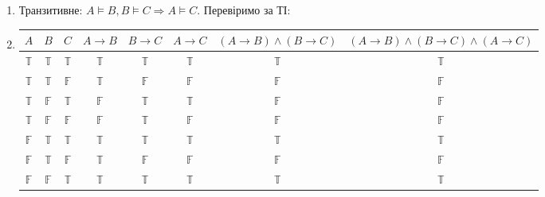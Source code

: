 \documentclass[a4paper,12pt]{article}
\begin{document}
\begin{enumerate}
\begin{enumerate}
\begin{enumerate}
\item Транзитивне: $A\models B, B\models C\Rightarrow A\models C.$ Перевіримо за ТІ:
\item \begin{table}[htp]\centering
\begin{tabular}{|c|c|c|c|c|c|c|c|}\hline
$A$          & $B$          & $C$          & $A\rightarrow B$                     & $B\rightarrow C$                     & $A\rightarrow C$ & $(A\rightarrow B)\land(B\rightarrow C)$ & $(A\rightarrow B)\land(B\rightarrow C)\land(A\rightarrow C)$ \\\hline
$\mathbb{T}$ & $\mathbb{T}$ & $\mathbb{T}$ & \cellcolor[HTML]{FFFFFF}$\mathbb{T}$ & \cellcolor[HTML]{FFFFFF}$\mathbb{T}$ & $\mathbb{T}$     & $\mathbb{T}$                            & \cellcolor[HTML]{9AFF99}$\mathbb{T}$                         \\
$\mathbb{T}$ & $\mathbb{T}$ & $\mathbb{F}$ & $\mathbb{T}$                         & $\mathbb{F}$                         & $\mathbb{F}$     & $\mathbb{F}$                            & $\mathbb{F}$                                                 \\
$\mathbb{T}$ & $\mathbb{F}$ & $\mathbb{T}$ & $\mathbb{F}$                         & $\mathbb{T}$                         & $\mathbb{T}$     & $\mathbb{F}$                            & $\mathbb{F}$                                                 \\
$\mathbb{T}$ & $\mathbb{F}$ & $\mathbb{F}$ & \cellcolor[HTML]{FFFFFF}$\mathbb{F}$ & \cellcolor[HTML]{FFFFFF}$\mathbb{T}$ & $\mathbb{F}$     & $\mathbb{F}$                            & $\mathbb{F}$                                                 \\
$\mathbb{F}$ & $\mathbb{T}$ & $\mathbb{T}$ & $\mathbb{T}$                         & $\mathbb{T}$                         & $\mathbb{T}$     & $\mathbb{T}$                            & \cellcolor[HTML]{9AFF99}$\mathbb{T}$                         \\
$\mathbb{F}$ & $\mathbb{T}$ & $\mathbb{F}$ & $\mathbb{T}$                         & $\mathbb{F}$                         & $\mathbb{F}$     & $\mathbb{F}$                            & $\mathbb{F}$                                                 \\
$\mathbb{F}$ & $\mathbb{F}$ & $\mathbb{T}$ & $\mathbb{T}$                         & $\mathbb{T}$                         & $\mathbb{T}$     & $\mathbb{T}$                            & \cellcolor[HTML]{9AFF99}$\mathbb{T}$                         \\

\end{tabular}
\end{table}
\end{enumerate}
\end{enumerate}
\end{enumerate}
\end{document}

